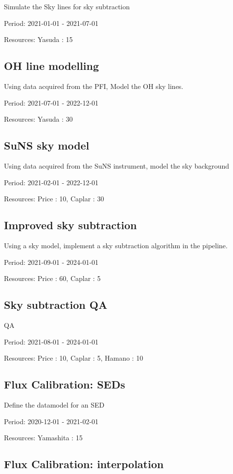 Simulate the Sky lines for sky subtraction

Period: 2021-01-01 - 2021-07-01

Resources: Yasuda : 15

\subsection{OH line modelling}

Using data acquired from the PFI, Model the OH sky lines.

Period: 2021-07-01 - 2022-12-01

Resources: Yasuda : 30

\subsection{SuNS sky model}

Using data acquired from the SuNS instrument, model the sky background

Period: 2021-02-01 - 2022-12-01

Resources: Price : 10, Caplar : 30

\subsection{Improved sky subtraction}

Using a sky model, implement a sky subtraction algorithm in the pipeline.

Period: 2021-09-01 - 2024-01-01

Resources: Price : 60, Caplar : 5

\subsection{Sky subtraction QA}

QA

Period: 2021-08-01 - 2024-01-01

Resources: Price : 10, Caplar : 5, Hamano : 10

\subsection{Flux Calibration: SEDs}

Define the datamodel for an SED

Period: 2020-12-01 - 2021-02-01

Resources: Yamashita : 15

\subsection{Flux Calibration: interpolation}

